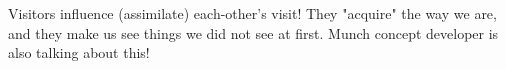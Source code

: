 
Visitors influence (assimilate) each-other's visit! They "acquire" the way we are, and they make us see things we did not see at first. Munch concept developer is also talking about this!
